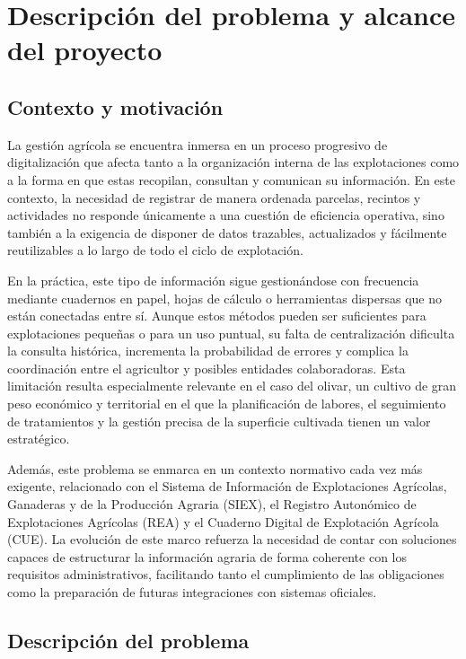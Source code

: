\chapter{Descripción del problema y alcance del proyecto}

\section{Contexto y motivación}

La gestión agrícola se encuentra inmersa en un proceso progresivo de digitalización que afecta tanto a la organización interna de las explotaciones como a la forma en que estas recopilan, consultan y comunican 
su información. En este contexto, la necesidad de registrar de manera ordenada parcelas, recintos y actividades no responde únicamente a una cuestión de eficiencia operativa, sino también a la exigencia de disponer 
de datos trazables, actualizados y fácilmente reutilizables a lo largo de todo el ciclo de explotación.

En la práctica, este tipo de información sigue gestionándose con frecuencia mediante cuadernos en papel, hojas de cálculo o herramientas dispersas que no están conectadas entre sí. Aunque estos métodos pueden ser 
suficientes para explotaciones pequeñas o para un uso puntual, su falta de centralización dificulta la consulta histórica, incrementa la probabilidad de errores y complica la coordinación entre el agricultor y posibles 
entidades colaboradoras. Esta limitación resulta especialmente relevante en el caso del olivar, un cultivo de gran peso económico y territorial en el que la planificación de labores, el seguimiento de tratamientos y la 
gestión precisa de la superficie cultivada tienen un valor estratégico.

Además, este problema se enmarca en un contexto normativo cada vez más exigente, relacionado con el Sistema de Información de Explotaciones Agrícolas, Ganaderas y de la Producción Agraria (SIEX), el Registro Autonómico de 
Explotaciones Agrícolas (REA) y el Cuaderno Digital de Explotación Agrícola (CUE). La evolución de este marco refuerza la necesidad de contar con soluciones capaces de estructurar la información agraria de forma coherente 
con los requisitos administrativos, facilitando tanto el cumplimiento de las obligaciones como la preparación de futuras integraciones con sistemas oficiales.

\section{Descripción del problema}


